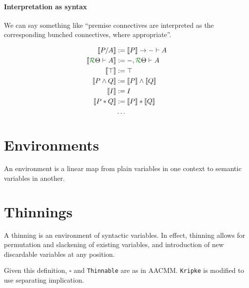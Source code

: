 \documentclass[a4paper]{article}
\begin{document}
\exIsumrules{}

\paragraph{Interpretation as syntax}
We can say something like ``premise connectives are interpreted as the
corresponding bunched connectives, where appropriate''.

\begin{align*}
  \sem{P/A} &:= \sem P \to {- \vdash A} \\
  \sem{\ctx \Theta R \vdash A} &:= {-, \ctx \Theta R \vdash A} \\
  \sem{\top} &:= \top \\
  \sem{P \wedge Q} &:= \sem P \wedge \sem Q \\
  \sem{I} &:= I \\
  \sem{P * Q} &:= \sem P * \sem Q \\
  &\ldots
\end{align*}

\section{Environments}

An environment is a linear map from plain variables in one context to semantic
variables in another.

\section{Thinnings}

A thinning is an environment of syntactic variables.
In effect, thinning allows for permutation and slackening of existing
variables, and introduction of new discardable variables at any position.

Given this definition, $\square$ and \texttt{Thinnable} are as in AACMM.
\texttt{Kripke} is modified to use separating implication.
\end{document}
